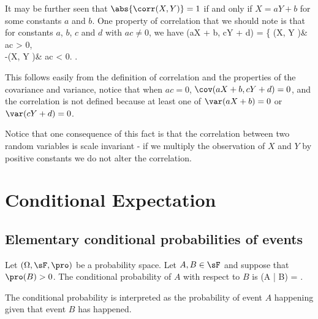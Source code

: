 \begin{remark}
It may be further seen that $\abs{\corr (X, Y )} = 1$ if and only if $X = aY +b$ for some constants $a$ and $b$. One property of correlation that we should note is that for constants $a$, $b$, $c$ and $d$ with $ac \neq 0$, we have
\be
\corr (aX + b, cY + d) = \left\{
\corr(X, Y )\quad\quad & ac > 0,\\
-\corr(X, Y )& ac < 0.
\ea\right.
\ee

This follows easily from the definition of correlation and the properties of the covariance and variance, notice that when $ac = 0$, $\cov (aX + b, cY + d) = 0$, and the correlation is not defined because at least one of $\var (aX + b) = 0$ or $\var (cY + d) = 0$.

Notice that one consequence of this fact is that the correlation between two random variables is scale invariant - if we multiply the observation of $X$ and $Y$ by positive constants we do not alter the correlation.
\end{remark}





\section{Conditional Expectation}

\subsection{Elementary conditional probabilities of events}

\begin{definition}\label{def:conditional_probability_elementary}
Let $(\Omega,\sF,\pro)$ be a probability space. Let $A, B \in \sF$ and suppose that $\pro(B) > 0$. The conditional probability of $A$ with respect to $B$ is
\be
\pro(A | B) = .
\ee
\end{definition}

\begin{remark}
The conditional probability is interpreted as the probability of event $A$ happening given that event $B$ has happened.
\end{remark}


